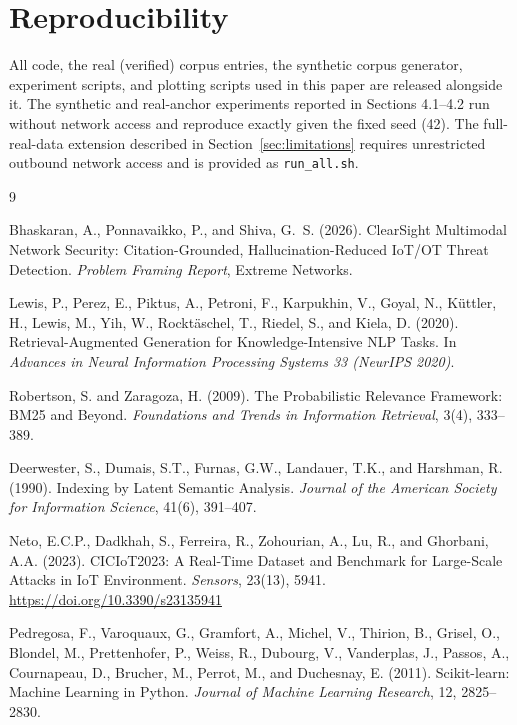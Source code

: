 \documentclass[11pt]{article}
\begin{document}
\section*{Reproducibility}

All code, the real (verified) corpus entries, the synthetic corpus generator, experiment scripts, and plotting scripts used in this paper are released alongside it. The synthetic and real-anchor experiments reported in Sections 4.1--4.2 run without network access and reproduce exactly given the fixed seed (42). The full-real-data extension described in Section~\ref{sec:limitations} requires unrestricted outbound network access and is provided as \texttt{run\_all.sh}.


\begin{thebibliography}{9}

Bhaskaran, A., Ponnavaikko, P., and Shiva, G.~S. (2026).
\newblock ClearSight Multimodal Network Security: Citation-Grounded, Hallucination-Reduced IoT/OT Threat Detection.
\newblock \emph{Problem Framing Report}, Extreme Networks.

Lewis, P., Perez, E., Piktus, A., Petroni, F., Karpukhin, V., Goyal, N., K\"uttler, H., Lewis, M., Yih, W., Rockt\"aschel, T., Riedel, S., and Kiela, D. (2020).
\newblock Retrieval-Augmented Generation for Knowledge-Intensive NLP Tasks.
\newblock In \emph{Advances in Neural Information Processing Systems 33 (NeurIPS 2020)}.

Robertson, S. and Zaragoza, H. (2009).
\newblock The Probabilistic Relevance Framework: BM25 and Beyond.
\newblock \emph{Foundations and Trends in Information Retrieval}, 3(4), 333--389.

Deerwester, S., Dumais, S.T., Furnas, G.W., Landauer, T.K., and Harshman, R. (1990).
\newblock Indexing by Latent Semantic Analysis.
\newblock \emph{Journal of the American Society for Information Science}, 41(6), 391--407.

Neto, E.C.P., Dadkhah, S., Ferreira, R., Zohourian, A., Lu, R., and Ghorbani, A.A. (2023).
\newblock CICIoT2023: A Real-Time Dataset and Benchmark for Large-Scale Attacks in IoT Environment.
\newblock \emph{Sensors}, 23(13), 5941. \url{https://doi.org/10.3390/s23135941}

Pedregosa, F., Varoquaux, G., Gramfort, A., Michel, V., Thirion, B., Grisel, O., Blondel, M., Prettenhofer, P., Weiss, R., Dubourg, V., Vanderplas, J., Passos, A., Cournapeau, D., Brucher, M., Perrot, M., and Duchesnay, E. (2011).
\newblock Scikit-learn: Machine Learning in Python.
\newblock \emph{Journal of Machine Learning Research}, 12, 2825--2830.


\end{thebibliography}
\end{document}
